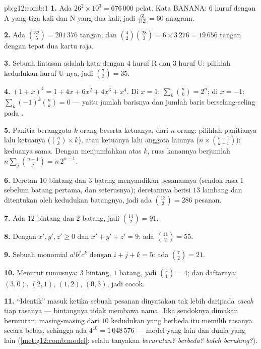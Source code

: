 \begin{solution}{pb:g12:comb:1}
\textbf{1.} Ada $26^2 \times 10^3 = 676\,000$ pelat. Kata BANANA: $6$
huruf dengan A yang tiga kali dan N yang dua kali, jadi
$\frac{6!}{3!\,2!} = 60$ anagram.

\textbf{2.} Ada $\binom{32}{5} = 201\,376$ tangan; dan
$\binom42 \binom{28}{3} = 6 \times 3\,276 = 19\,656$ tangan dengan
tepat dua kartu raja.

\textbf{3.} Sebuah lintasan adalah kata dengan $4$ huruf R dan $3$ huruf U:
pilihlah kedudukan huruf U-nya, jadi $\binom73 = 35$.

\textbf{4.} $(1+x)^4 = 1 + 4x + 6x^2 + 4x^3 + x^4$. Di
$x = 1$: $\sum_k \binom nk = 2^n$; di $x = -1$:
$\sum_k (-1)^k \binom nk = 0$ --- yaitu jumlah barisnya dan jumlah baris
berselang-seling pada .

\textbf{5.} Panitia beranggota $k$ orang beserta ketuanya, dari $n$ orang:
pilihlah panitianya lalu ketuanya ($\binom nk \times k$), atau
ketuanya lalu anggota lainnya
($n \times \binom{n-1}{k-1}$): keduanya sama. Dengan menjumlahkan atas $k$,
ruas kanannya berjumlah $n \sum_j \binom{n-1}{j} = n\,2^{n-1}$.

\textbf{6.} Deretan $10$ bintang dan $3$ batang menyandikan pesanannya
(sendok rasa 1 sebelum batang pertama, dan seterusnya); deretannya berisi
$13$ lambang dan ditentukan oleh kedudukan batangnya, jadi ada
$\binom{13}{3} = 286$ pesanan.

\textbf{7.} Ada $12$ bintang dan $2$ batang, jadi $\binom{14}{2} = 91$.

\textbf{8.} Dengan $x', y', z' \geq 0$ dan
$x' + y' + z' = 9$: ada $\binom{11}{2} = 55$.

\textbf{9.} Sebuah monomial $a^i b^j c^k$ dengan $i + j + k = 5$:
ada $\binom72 = 21$.

\textbf{10.} Menurut rumusnya: $3$ bintang, $1$ batang, jadi $\binom41 = 4$;
dan daftarnya: $(3,0)$, $(2,1)$, $(1,2)$, $(0,3)$, jadi cocok.

\textbf{11.} ``Identik'' masuk ketika sebuah pesanan dinyatakan
tak lebih daripada \emph{cacah} tiap rasanya --- bintangnya
tidak membawa nama. Jika sendoknya dimakan berurutan, masing-masing dari
$10$ kedudukan yang berbeda itu memilih rasanya secara bebas, sehingga ada
$4^{10} = 1\,048\,576$  --- model yang lain dan dunia
yang lain (\cref{met:g12:comb:model}: selalu tanyakan
\emph{berurutan? berbeda? boleh berulang?}).


\end{solution}
